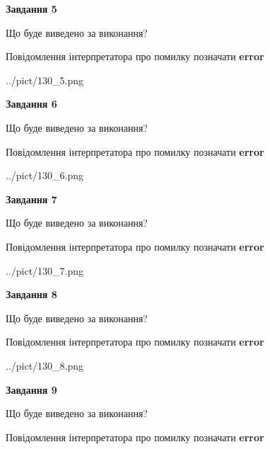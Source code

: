 \documentclass[11pt, ukrainian]{article}
\begin{document}
{\begin {large}
{\begin {center}\textbf{Завдання 5}\end {center}}\par
Що буде виведено за виконання? \par
Повідомлення інтерпретатора про помилку позначати \textbf{error}

\begin{center}
	{../pict/130_5.png}
\end{center}
\newpage

{\begin {center}\textbf{Завдання 6}\end {center}}\par
Що буде виведено за виконання? \par
Повідомлення інтерпретатора про помилку позначати \textbf{error}

\begin{center}
	{../pict/130_6.png}
\end{center}
\newpage

{\begin {center}\textbf{Завдання 7}\end {center}}\par
Що буде виведено за виконання? \par
Повідомлення інтерпретатора про помилку позначати \textbf{error}

\begin{center}
	{../pict/130_7.png}
\end{center}
\newpage

{\begin {center}\textbf{Завдання 8}\end {center}}\par
Що буде виведено за виконання? \par
Повідомлення інтерпретатора про помилку позначати \textbf{error}

\begin{center}
	{../pict/130_8.png}
\end{center}
\newpage

{\begin {center}\textbf{Завдання 9}\end {center}}\par
Що буде виведено за виконання? \par
Повідомлення інтерпретатора про помилку позначати \textbf{error}


\end{large}}
\end{document}
